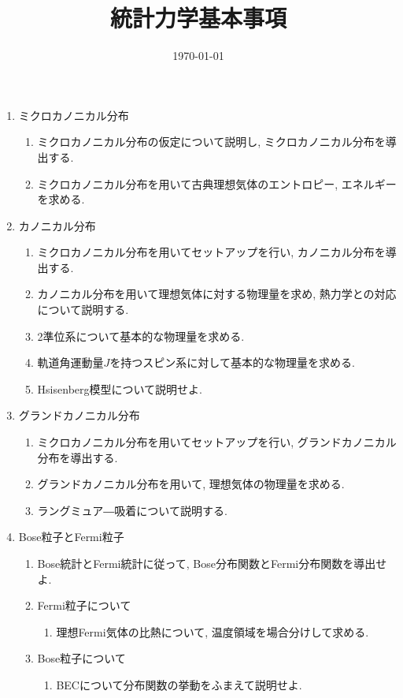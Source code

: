 \documentclass[11pt,a4paper]{jarticle}
\title{統計力学基本事項}
\author{}
\date{\today}
\begin{document}
\maketitle
\begin{enumerate}
    \item ミクロカノニカル分布
    \begin{enumerate}
        \item ミクロカノニカル分布の仮定について説明し, ミクロカノニカル分布を導出する.
        \item ミクロカノニカル分布を用いて古典理想気体のエントロピー, エネルギーを求める.
    \end{enumerate}
    \item カノニカル分布
    \begin{enumerate}
        \item ミクロカノニカル分布を用いてセットアップを行い, カノニカル分布を導出する.
        \item カノニカル分布を用いて理想気体に対する物理量を求め, 熱力学との対応について説明する.
        \item 2準位系について基本的な物理量を求める.
        \item 軌道角運動量$J$を持つスピン系に対して基本的な物理量を求める.
        \item Hsisenberg模型について説明せよ.
    \end{enumerate}
    \item グランドカノニカル分布
    \begin{enumerate}
        \item ミクロカノニカル分布を用いてセットアップを行い, グランドカノニカル分布を導出する.
        \item グランドカノニカル分布を用いて, 理想気体の物理量を求める.
        \item ラングミュア―吸着について説明する.
    \end{enumerate}
    \item Bose粒子とFermi粒子
    \begin{enumerate}
        \item Bose統計とFermi統計に従って, Bose分布関数とFermi分布関数を導出せよ.
        \item Fermi粒子について
        \begin{enumerate}
            \item 理想Fermi気体の比熱について, 温度領域を場合分けして求める.
        \end{enumerate}
        \item Bose粒子について
        \begin{enumerate}
            \item BECについて分布関数の挙動をふまえて説明せよ.
        \end{enumerate}
    \end{enumerate}
\end{enumerate}
\end{document}
